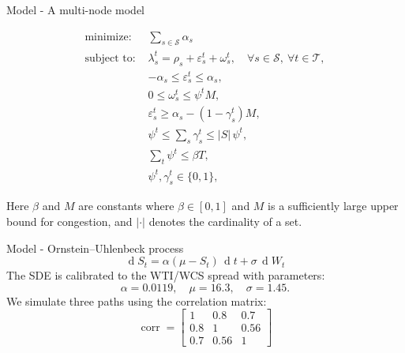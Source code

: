 \documentclass[aspectratio = 169]{beamer}
\renewcommand{\S}{\mathcal{S}}
\newcommand{\T}{\mathcal{T}}
\begin{document}
\begin{frame}{Model - A multi-node model}
\vspace{-0.7cm}
\begin{figure}
\begin{equation*}
\begin{split}
\text{minimize: } &\sum_{s\in\S} \alpha_s\\
\text{subject to: } &\lambda_s^t = \rho_s + \varepsilon_s^t +\omega_s^t, \quad \forall s\in\S,~\forall t\in\T,\\
&-\alpha_s\leq\varepsilon_s^t \leq \alpha_s,\\
&0\leq\omega_s^t\leq \psi^t M,\\
&\varepsilon_s^t \geq \alpha_s - (1-\gamma_s^t) M,\\
&\psi^t \leq \sum_s \gamma_s^t\leq |S|\,\psi^t,\\
&\sum_t \psi^t \leq \beta T,\\
&\psi^t, \gamma_s^t \in\{0,1\},
\end{split}
\end{equation*}
\end{figure}
Here $\beta$ and $M$ are constants where $\beta \in [0,1]$ and $M$ is a sufficiently large upper bound for congestion, and $\lvert \cdot \rvert$ denotes the cardinality of a set.
\end{frame} 


\begin{frame}{Model - Ornstein--Uhlenbeck process}
$$\operatorname{d}\!S_t = \alpha(\mu-S_t)\,\operatorname{d}\!t +\sigma \,\operatorname{d}\!W_t$$
\bigskip
The SDE is calibrated to the WTI/WCS spread with parameters: 
$$\alpha = 0.0119, \quad \mu = 16.3,\quad\sigma = 1.45.$$
We simulate three paths using the correlation matrix:
\begin{equation*}\operatorname{corr} = 
    \begin{bmatrix}
    1& 0.8& 0.7\\
    0.8& 1 &0.56\\
    0.7 & 0.56 &1
    \end{bmatrix}
\end{equation*}
\end{frame}
\end{document}
